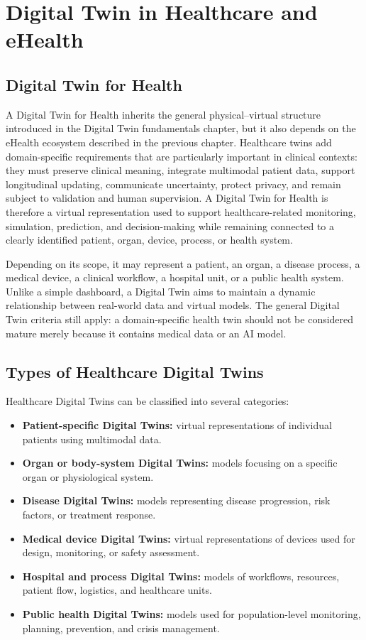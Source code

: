 \chapter{Digital Twin in Healthcare and eHealth}

\section{Digital Twin for Health}
A Digital Twin for Health inherits the general physical--virtual structure introduced in the Digital Twin fundamentals chapter, but it also depends on the eHealth ecosystem described in the previous chapter. Healthcare twins add domain-specific requirements that are particularly important in clinical contexts: they must preserve clinical meaning, integrate multimodal patient data, support longitudinal updating, communicate uncertainty, protect privacy, and remain subject to validation and human supervision. A Digital Twin for Health is therefore a virtual representation used to support healthcare-related monitoring, simulation, prediction, and decision-making while remaining connected to a clearly identified patient, organ, device, process, or health system.

Depending on its scope, it may represent a patient, an organ, a disease process, a medical device, a clinical workflow, a hospital unit, or a public health system. Unlike a simple dashboard, a Digital Twin aims to maintain a dynamic relationship between real-world data and virtual models. The general Digital Twin criteria still apply: a domain-specific health twin should not be considered mature merely because it contains medical data or an AI model.

\section{Types of Healthcare Digital Twins}
Healthcare Digital Twins can be classified into several categories:

\begin{itemize}[leftmargin=*]
    \item \textbf{Patient-specific Digital Twins:} virtual representations of individual patients using multimodal data.
    \item \textbf{Organ or body-system Digital Twins:} models focusing on a specific organ or physiological system.
    \item \textbf{Disease Digital Twins:} models representing disease progression, risk factors, or treatment response.
    \item \textbf{Medical device Digital Twins:} virtual representations of devices used for design, monitoring, or safety assessment.
    \item \textbf{Hospital and process Digital Twins:} models of workflows, resources, patient flow, logistics, and healthcare units.
    \item \textbf{Public health Digital Twins:} models used for population-level monitoring, planning, prevention, and crisis management.
\end{itemize}

